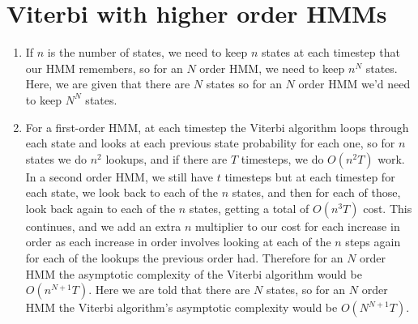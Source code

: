 \documentclass[12pt]{article}
\begin{document}
\section*{Viterbi with higher order HMMs}
\begin{enumerate}
    \item If $n$ is the number of states, we need to keep $n$ states at each timestep that our HMM remembers, so for an $N$ order HMM, we need to keep $n^N$ states. Here, we are given that there are $N$ states so for an $N$ order HMM we'd need to keep $N^N$ states.
    \item For a first-order HMM, at each timestep the Viterbi algorithm loops through each state and looks at each previous state probability for each one, so for $n$ states we do $n^2$ lookups, and if there are $T$ timesteps, we do $O(n^2T)$ work.
    In a second order HMM, we still have $t$ timesteps but at each timestep for each state, we look back to each of the $n$ states, and then for each of those, look back again to each of the $n$ states, getting a total of $O(n^3T)$ cost.
    This continues, and we add an extra $n$ multiplier to our cost for each increase in order as each increase in order involves looking at each of the $n$ steps again for each of the lookups the previous order had. Therefore for an $N$ order HMM the asymptotic complexity of the Viterbi algorithm would be $O(n^{N+1}T)$. 
    Here we are told that there are $N$ states, so for an $N$ order HMM the Viterbi algorithm's asymptotic complexity would be $O(N^{N+1}T)$.
\end{enumerate}
\end{document}
